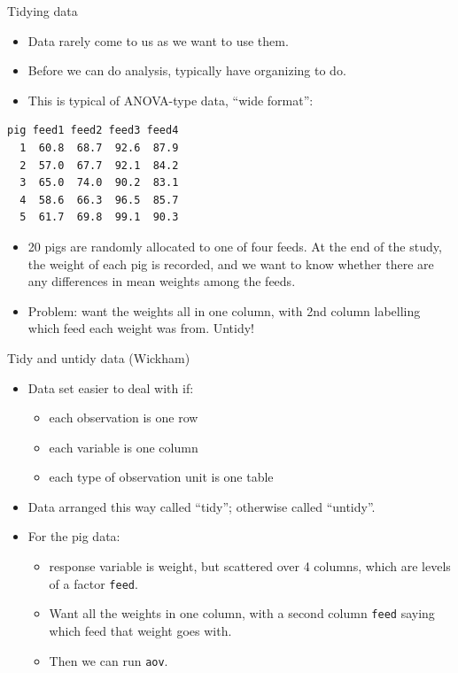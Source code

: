 \documentclass[ignorenonframetext,]{beamer}
\providecommand{\tightlist}{%
  \setlength{\itemsep}{0pt}\setlength{\parskip}{0pt}}
\begin{document}
\begin{frame}[fragile]{Tidying data}
\protect\hypertarget{tidying-data}{}

\begin{itemize}
\tightlist
\item
  Data rarely come to us as we want to use them.
\item
  Before we can do analysis, typically have organizing to do.
\item
  This is typical of ANOVA-type data, ``wide format'':
\end{itemize}

\begin{verbatim}
pig feed1 feed2 feed3 feed4
  1  60.8  68.7  92.6  87.9
  2  57.0  67.7  92.1  84.2
  3  65.0  74.0  90.2  83.1
  4  58.6  66.3  96.5  85.7
  5  61.7  69.8  99.1  90.3
\end{verbatim}

\begin{itemize}
\tightlist
\item
  20 pigs are randomly allocated to one of four feeds. At the end of the
  study, the weight of each pig is recorded, and we want to know whether
  there are any differences in mean weights among the feeds.
\item
  Problem: want the weights all in one column, with 2nd column labelling
  which feed each weight was from. Untidy!
\end{itemize}

\end{frame}

\begin{frame}[fragile]{Tidy and untidy data (Wickham)}
\protect\hypertarget{tidy-and-untidy-data-wickham}{}

\begin{itemize}
\tightlist
\item
  Data set easier to deal with if:

  \begin{itemize}
  \tightlist
  \item
    each observation is one row
  \item
    each variable is one column
  \item
    each type of observation unit is one table
  \end{itemize}
\item
  Data arranged this way called ``tidy''; otherwise called ``untidy''.
\item
  For the pig data:

  \begin{itemize}
  \tightlist
  \item
    response variable is weight, but scattered over 4 columns, which are
    levels of a factor \texttt{feed}.
  \item
    Want all the weights in one column, with a second column
    \texttt{feed} saying which feed that weight goes with.
  \item
    Then we can run \texttt{aov}.
  \end{itemize}
\end{itemize}

\end{frame}
\end{document}
